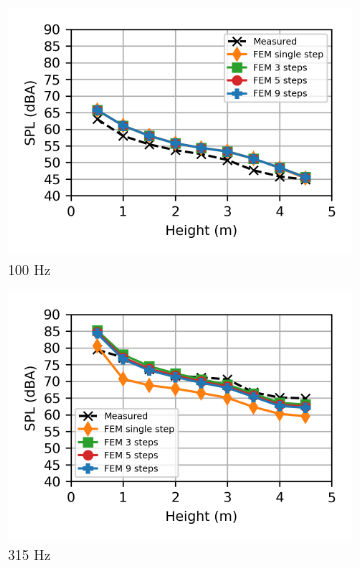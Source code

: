 \begin{figure}
	\centering
	\begin{subfigure}[b]{0.49\textwidth}
		\centering
		\includegraphics{fig/chap5/freq_steps/third_octave_over_height/100_Hz.png}
		\caption{100 Hz}
	\end{subfigure}
	\hfill
	\begin{subfigure}[b]{0.49\textwidth}
		\centering
		\includegraphics{fig/chap5/freq_steps/third_octave_over_height/315_Hz.png}
		\caption{315 Hz}
	\end{subfigure}
	\\
	\begin{subfigure}[b]{0.49\textwidth}
		\centering

\end{subfigure}
\end{figure}
